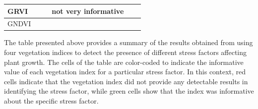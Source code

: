 \documentclass{article}
\begin{document}
{\begin{landscape}
\begin{table}[h]
{\begin{tabular}{|p{2cm}|p{4cm}|p{5cm}|p{4cm}|p{4cm}|p{4cm}|}
                        \centering \vspace{0.1cm}GRVI & \cellcolor{green!30} & \cellcolor{green!30}  &\centering \vspace{-0.4cm} not very informative & \cellcolor{green!30}    & \cellcolor{red!30} \\
                        \hline
                        
                        \centering \vspace*{1\baselineskip}GNDVI & \cellcolor{green!30}  & \cellcolor{green!30}  & \cellcolor{green!30}  &       \cellcolor{green!30}& \cellcolor{red!30}                               \\
                            \hline
                       \end{tabular}}
                    \end{table}
                    \vspace*{2\baselineskip}
                    
                    \vspace{2\baselineskip}

                    
               \end{landscape}}
                    The table presented above provides a summary of the results obtained from using four vegetation indices to detect the presence of different stress factors affecting plant growth. The cells of the table are color-coded to indicate the informative value of each vegetation index for a particular stress factor. In this context, red cells indicate that the vegetation index did not provide any detectable results in identifying the stress factor, while green cells show that the index was informative about the specific stress factor.\par
                    \vspace*{1\baselineskip}
                    
\end{document}

